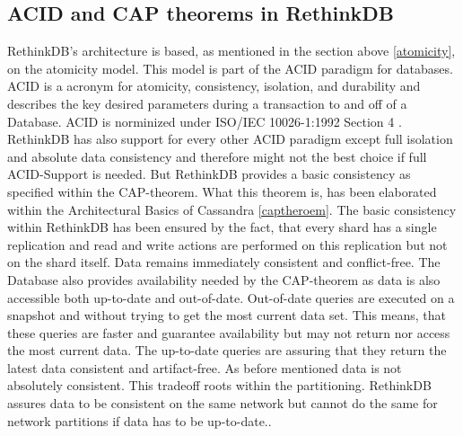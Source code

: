 \subsection{ACID and CAP theorems in RethinkDB}
\label{acidcap}
RethinkDB’s architecture is based, as mentioned in the section above \ref{atomicity}, on the atomicity model. This model is part of the ACID paradigm for databases. ACID is a acronym for atomicity, consistency, isolation, and durability and describes the key desired parameters during a transaction to and off of a Database. ACID is norminized under ISO/IEC 10026-1:1992 Section 4 \cite{TechTargetAcid}. 
RethinkDB has also support for every other ACID paradigm except full isolation and absolute data consistency and therefore might not the best choice if full ACID-Support is needed. But RethinkDB provides a basic consistency as specified within the CAP-theorem. What this theorem is, has been elaborated within the Architectural Basics of Cassandra \ref{captheroem}. The basic consistency within RethinkDB has been ensured by the fact, that every shard has a single replication and read and write actions are performed on this replication but not on the shard itself. Data remains immediately consistent and conflict-free. 
The Database also provides availability needed by the CAP-theorem as data is also accessible both up-to-date and out-of-date. Out-of-date queries are executed on a snapshot and without trying to get the most current data set. This means, that these queries are faster and guarantee availability but may not return nor access the most current data. The up-to-date queries are assuring that they return the latest data consistent and artifact-free. As before mentioned data is not absolutely consistent. This tradeoff roots within the partitioning. RethinkDB assures data to be consistent on the same network but cannot do the same for network partitions if data has to be up-to-date.\cite{RethinkCAP}. 

